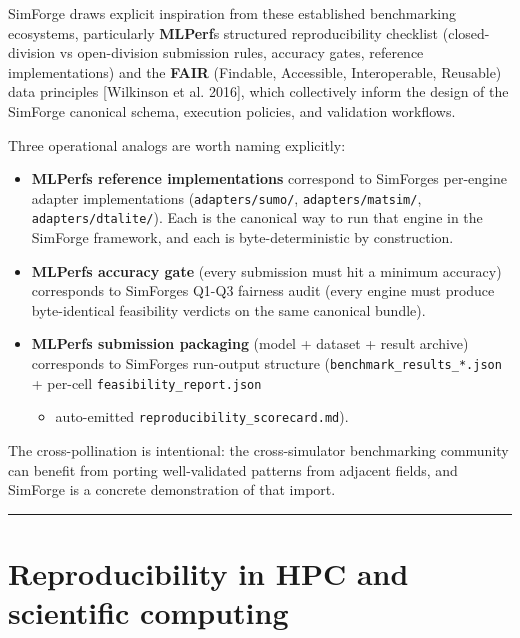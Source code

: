 SimForge draws explicit inspiration from these established benchmarking
ecosystems, particularly \textbf{MLPerf}\textquotesingle s structured
reproducibility checklist (closed-division vs open-division submission
rules, accuracy gates, reference implementations) and the \textbf{FAIR}
(Findable, Accessible, Interoperable, Reusable) data principles
{[}Wilkinson et al. 2016{]}, which collectively inform the design of the
SimForge canonical schema, execution policies, and validation workflows.

Three operational analogs are worth naming explicitly:

\begin{itemize}
\item
  \textbf{MLPerf\textquotesingle s reference implementations} correspond
  to SimForge\textquotesingle s per-engine adapter implementations
  (\texttt{adapters/sumo/}, \texttt{adapters/matsim/},
  \texttt{adapters/dtalite/}). Each is the canonical way to run that
  engine in the SimForge framework, and each is byte-deterministic by
  construction.
\item
  \textbf{MLPerf\textquotesingle s accuracy gate} (every submission must
  hit a minimum accuracy) corresponds to SimForge\textquotesingle s
  Q1-Q3 fairness audit (every engine must produce byte-identical
  feasibility verdicts on the same canonical bundle).
\item
  \textbf{MLPerf\textquotesingle s submission packaging} (model +
  dataset + result archive) corresponds to SimForge\textquotesingle s
  run-output structure (\texttt{benchmark\_results\_*.json} + per-cell
  \texttt{feasibility\_report.json}

  \begin{itemize}
  \tightlist
  \item
    auto-emitted \texttt{reproducibility\_scorecard.md}).
  \end{itemize}
\end{itemize}

The cross-pollination is intentional: the cross-simulator benchmarking
community can benefit from porting well-validated patterns from adjacent
fields, and SimForge is a concrete demonstration of that import.

\begin{center}\rule{0.5\linewidth}{0.5pt}\end{center}

\section{Reproducibility in HPC and scientific
computing}\label{27-reproducibility-in-hpc-and-scientific-computing}

